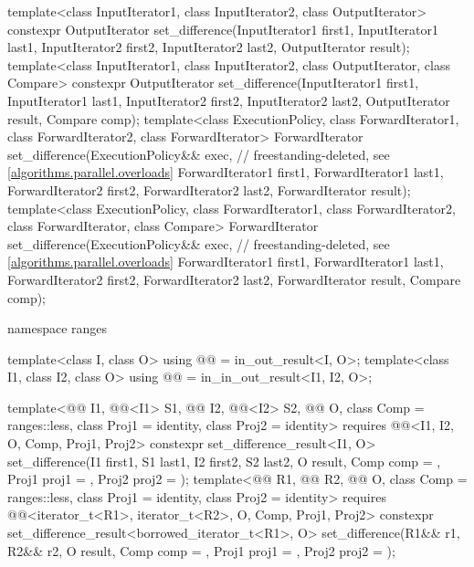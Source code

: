\begin{codeblock}
{  template<class InputIterator1, class InputIterator2, class OutputIterator>
    constexpr OutputIterator
      set_difference(InputIterator1 first1, InputIterator1 last1,
                     InputIterator2 first2, InputIterator2 last2,
                     OutputIterator result);
  template<class InputIterator1, class InputIterator2, class OutputIterator, class Compare>
    constexpr OutputIterator
      set_difference(InputIterator1 first1, InputIterator1 last1,
                     InputIterator2 first2, InputIterator2 last2,
                     OutputIterator result, Compare comp);
  template<class ExecutionPolicy, class ForwardIterator1, class ForwardIterator2,
           class ForwardIterator>
    ForwardIterator
      set_difference(ExecutionPolicy&& exec,                    // freestanding-deleted, see \ref{algorithms.parallel.overloads}
                     ForwardIterator1 first1, ForwardIterator1 last1,
                     ForwardIterator2 first2, ForwardIterator2 last2,
                     ForwardIterator result);
  template<class ExecutionPolicy, class ForwardIterator1, class ForwardIterator2,
           class ForwardIterator, class Compare>
    ForwardIterator
      set_difference(ExecutionPolicy&& exec,                    // freestanding-deleted, see \ref{algorithms.parallel.overloads}
                     ForwardIterator1 first1, ForwardIterator1 last1,
                     ForwardIterator2 first2, ForwardIterator2 last2,
                     ForwardIterator result, Compare comp);

  namespace ranges {
    template<class I, class O>
      using @@ = in_out_result<I, O>;
    template<class I1, class I2, class O>
      using @@ = in_in_out_result<I1, I2, O>;

    template<@@ I1, @@<I1> S1, @@ I2, @@<I2> S2,
             @@ O, class Comp = ranges::less,
             class Proj1 = identity, class Proj2 = identity>
      requires @@<I1, I2, O, Comp, Proj1, Proj2>
      constexpr set_difference_result<I1, O>
        set_difference(I1 first1, S1 last1, I2 first2, S2 last2, O result,
                       Comp comp = {}, Proj1 proj1 = {}, Proj2 proj2 = {});
    template<@@ R1, @@ R2, @@ O,
             class Comp = ranges::less, class Proj1 = identity, class Proj2 = identity>
      requires @@<iterator_t<R1>, iterator_t<R2>, O, Comp, Proj1, Proj2>
      constexpr set_difference_result<borrowed_iterator_t<R1>, O>
        set_difference(R1&& r1, R2&& r2, O result,
                       Comp comp = {}, Proj1 proj1 = {}, Proj2 proj2 = {});

}}
\end{codeblock}
